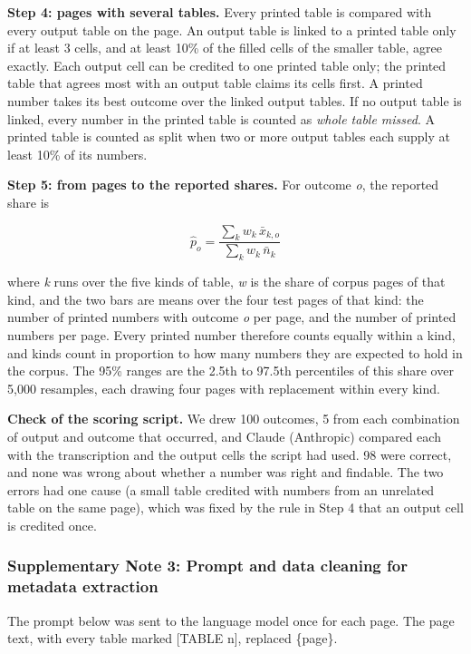 \textbf{Step 4: pages with several tables.} Every printed table is compared with every output table on the page. An output table is linked to a printed table only if at least 3 cells, and at least 10\% of the filled cells of the smaller table, agree exactly. Each output cell can be credited to one printed table only; the printed table that agrees most with an output table claims its cells first. A printed number takes its best outcome over the linked output tables. If no output table is linked, every number in the printed table is counted as \textit{whole table missed}. A printed table is counted as split when two or more output tables each supply at least 10\% of its numbers.

\textbf{Step 5: from pages to the reported shares.} For outcome \textit{o}, the reported share is

\begin{equation*}
\hat{p}_o = \frac{\sum_k w_k \, \bar{x}_{k,o}}{\sum_k w_k \, \bar{n}_k}
\end{equation*}

where \textit{k} runs over the five kinds of table, \textit{w} is the share of corpus pages of that kind, and the two bars are means over the four test pages of that kind: the number of printed numbers with outcome \textit{o} per page, and the number of printed numbers per page. Every printed number therefore counts equally within a kind, and kinds count in proportion to how many numbers they are expected to hold in the corpus. The 95\% ranges are the 2.5th to 97.5th percentiles of this share over 5,000 resamples, each drawing four pages with replacement within every kind.

\textbf{Check of the scoring script.} We drew 100 outcomes, 5 from each combination of output and outcome that occurred, and Claude (Anthropic) compared each with the transcription and the output cells the script had used. 98 were correct, and none was wrong about whether a number was right and findable. The two errors had one cause (a small table credited with numbers from an unrelated table on the same page), which was fixed by the rule in Step 4 that an output cell is credited once.

\subsubsection*{Supplementary Note 3: Prompt and data cleaning for metadata extraction}

The prompt below was sent to the language model once for each page. The page text, with every table marked [TABLE n], replaced \{page\}.

